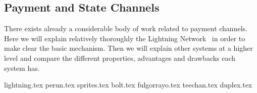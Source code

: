 \subsection{Payment and State Channels}
\label{sec:literaturereview:channels}
  There exists already a considerable body of work related to payment channels. Here we
  will explain relatively thoroughly the Lightning Network~\cite{lightning} in order to
  make clear the basic mechanism. Then we will explain other systems at a higher level and
  compare the different properties, advantages and drawbacks each system has.

  {lightning.tex}
  {perun.tex}
  {sprites.tex}
  {bolt.tex}
  {fulgorrayo.tex}
  {teechan.tex}
  {duplex.tex}
